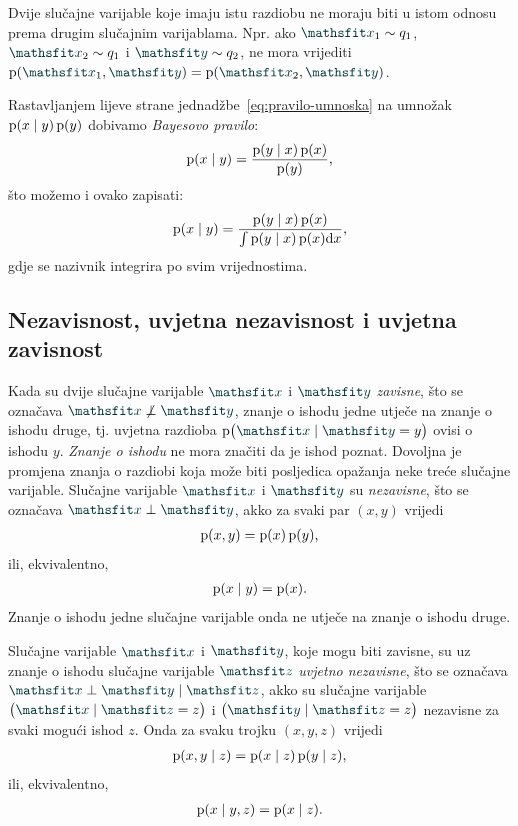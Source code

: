 \documentclass[utf8, diplomski, lmodern]{fer}
\begin{document}
Dvije slučajne varijable koje imaju istu razdiobu ne moraju biti u istom odnosu prema drugim slučajnim varijablama. Npr. ako $\rvar x_1\sim q_1$, $\rvar x_2\sim q_1$ i $\rvar y\sim q_2$, ne mora vrijediti $\p(\rvar x_1, \rvar y) = \p(\rvar x_2, \rvar y)$.

Rastavljanjem lijeve strane jednadžbe~\eqref{eq:pravilo-umnoska} na umnožak $\operatorname*{\mathrm{p}}(x\mid y)\operatorname*{\mathrm{p}}(y)$ dobivamo \emph{Bayesovo pravilo}:
\begin{align}
\operatorname*{\mathrm{p}}(x\mid y) = \frac{\operatorname*{\mathrm{p}}(y\mid x)\operatorname*{\mathrm{p}}(x)}{\operatorname*{\mathrm{p}}(y)} \text{,}
\end{align}
što možemo i ovako zapisati:
\begin{align}
\operatorname*{\mathrm{p}}(x\mid y) = \frac{\operatorname*{\mathrm{p}}(y\mid x)\operatorname*{\mathrm{p}}(x)}{\int\operatorname*{\mathrm{p}}(y\mid x)\operatorname*{\mathrm{p}}(x)\mathrm{d} x} \text{,}
\end{align}
gdje se nazivnik integrira po svim vrijednostima.

\subsection{Nezavisnost, uvjetna nezavisnost i uvjetna zavisnost}

Kada su dvije slučajne varijable $\rvar x$ i $\rvar y$ \emph{zavisne}, što se označava $\rvar x\not\perp\rvar y$, znanje o ishodu jedne utječe na znanje o ishodu druge, tj. uvjetna razdioba $\p\del{\rvar x\mid\rvar y = y}$ ovisi o ishodu $y$. \textit{Znanje o ishodu} ne mora značiti da je ishod poznat. Dovoljna je promjena znanja o razdiobi koja može biti posljedica opažanja neke treće slučajne varijable. Slučajne varijable $\rvar x$ i $\rvar y$ su \emph{nezavisne}, što se označava $\rvar x\perp\rvar y$, akko za svaki par $(x, y)$ vrijedi
\begin{align}
\operatorname*{\mathrm{p}}(x,y)=\operatorname*{\mathrm{p}}(x)\operatorname*{\mathrm{p}}(y) \text{,}
\end{align}
ili, ekvivalentno,
\begin{align}
\operatorname*{\mathrm{p}}(x\mid y) = \operatorname*{\mathrm{p}}(x) \text{.}
\end{align}
Znanje o ishodu jedne slučajne varijable onda ne utječe na znanje o ishodu druge.

Slučajne varijable $\rvar x$ i $\rvar y$, koje mogu biti zavisne, su uz znanje o ishodu slučajne varijable $\rvar z$ \emph{uvjetno nezavisne}, što se označava $\rvar x\perp\rvar y\mid\rvar z$, akko su slučajne varijable $\del{\rvar x\mid\rvar z=z}$ i $\del{\rvar y\mid\rvar z=z}$ nezavisne za svaki mogući ishod $z$. Onda za svaku trojku $(x,y,z)$ vrijedi
\begin{align}
\operatorname*{\mathrm{p}}(x,y\mid z) = \operatorname*{\mathrm{p}}(x\mid z)\operatorname*{\mathrm{p}}(y\mid z) \text{,}
\end{align}
 ili, ekvivalentno,
\begin{align}
\operatorname*{\mathrm{p}}(x\mid y,z) = \operatorname*{\mathrm{p}}(x\mid z) \text{.}
\end{align}
\end{document}
